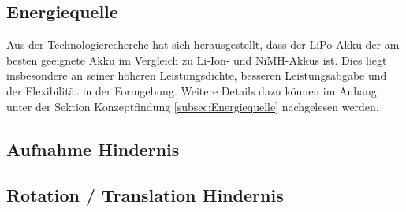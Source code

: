 \documentclass[../main.tex]{subfiles}
\begin{document}
\subsection{Energiequelle}
Aus der Technologierecherche hat sich herausgestellt, dass der LiPo-Akku der am besten geeignete Akku im Vergleich zu Li-Ion- und NiMH-Akkus ist. Dies liegt insbesondere an seiner höheren Leistungsdichte, besseren Leistungsabgabe und der Flexibilität in der Formgebung. Weitere Details dazu können im Anhang unter der Sektion Konzeptfindung \ref{subsec:Energiequelle} nachgelesen werden.

\subsection{Aufnahme Hindernis}



\subsection{Rotation / Translation Hindernis}
\end{document}

